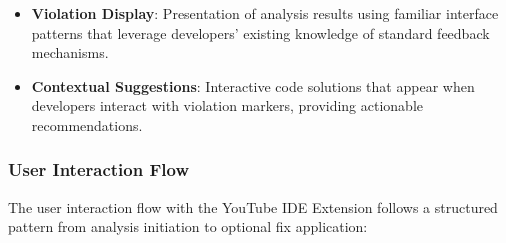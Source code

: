 \begin{spacing}{1.2}
\begin{itemize}
    \item \textbf{Violation Display}: Presentation of analysis results using familiar interface patterns that leverage developers' existing knowledge of standard feedback mechanisms.
    
    \item \textbf{Contextual Suggestions}: Interactive code solutions that appear when developers interact with violation markers, providing actionable recommendations.
\end{itemize}


\subsubsection{User Interaction Flow}
The user interaction flow with the YouTube IDE Extension follows a structured pattern from analysis initiation to optional fix application:


\end{spacing}

